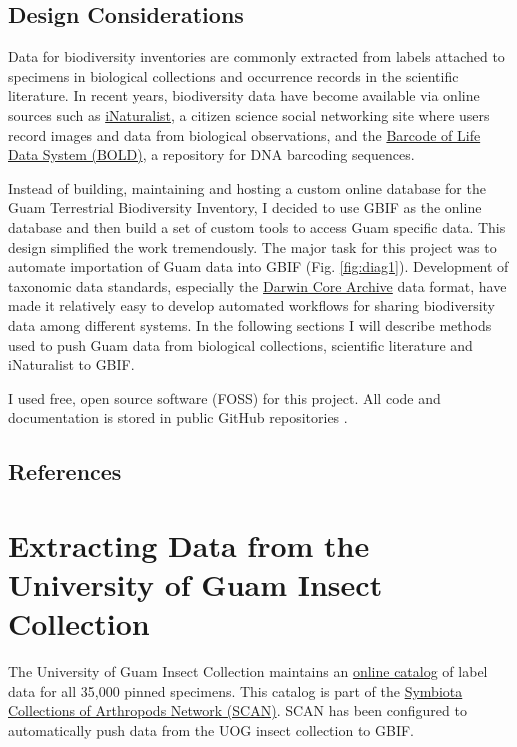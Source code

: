 \documentclass[12pt,letterpaper,english,bibliography=totocnumbered, abstract=on]{scrartcl}
\begin{document}
\subsection{Design Considerations}

Data for biodiversity inventories are commonly extracted from labels attached to specimens in biological collections and occurrence records in the scientific literature. In recent years, biodiversity data have become available via online sources such as \href{https://inaturalist.org}{iNaturalist}, a citizen science social networking site where users record images and data from biological observations, and the \href{https://v3.boldsystems.org/}{Barcode of Life Data System (BOLD)}, a repository for DNA barcoding sequences.

Instead of building, maintaining and hosting a custom online database for the Guam Terrestrial Biodiversity Inventory, I decided to use GBIF as the online database and then build a set of custom tools to access Guam specific data. This design simplified the work tremendously. The major task for this project was to automate importation of Guam data into GBIF (Fig. \ref{fig:diag1}). Development of taxonomic data standards, especially the \href{https://www.gbif.org/darwin-core}{Darwin Core Archive} data format, have made it relatively easy to develop automated workflows for sharing biodiversity data among different systems. In the following sections I will describe methods used to push Guam data from biological collections, scientific literature and iNaturalist to GBIF.

I used free, open source software (FOSS) for this project. All code and documentation is stored in public GitHub repositories \cite{gh-McIntire-Stennis,gh-datamining-insect-of-guam,gh-guam-insect-list}. 

\subsection{References}

\printbibliography[heading=none]





\pagebreak
\section{Extracting Data from the University of Guam Insect Collection}

The University of Guam Insect Collection maintains an \href{https://scan-bugs.org/portal/collections/misc/collprofiles.php?collid=180}{online catalog} of label data for all 35,000 pinned specimens. This catalog is part of the \href{https://scan-bugs.org/portal/}{Symbiota Collections of Arthropods Network (SCAN)}. SCAN has been configured to automatically push data from the UOG insect collection to GBIF.
\end{document}

